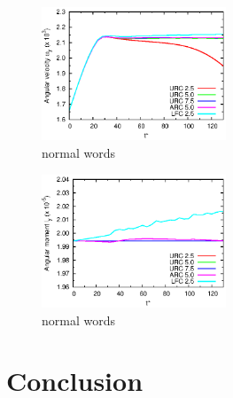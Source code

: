 \documentclass[aps,pre,preprint]{revtex4}
\begin{document}
\begin{figure}
  \centering
  \includegraphics[width=0.49\textwidth]{fig/wy.eps}
  \caption{normal words}
  \label{fig:tmp11}
\end{figure}

\begin{figure}
  \centering
  \includegraphics[width=0.49\textwidth]{fig/ly.eps}
  \caption{normal words}
  \label{fig:tmp12}
\end{figure}



\section{Conclusion}\label{sec:conclusion}



{}

\end{document}
